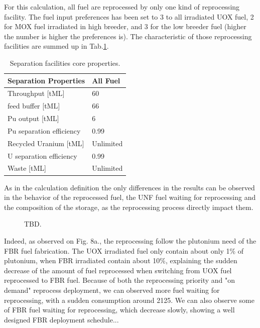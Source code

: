 \documentclass[12pt]{article}
\begin{document}
For this calculation, all fuel are reprocessed by
only one kind of reprocessing facility. The fuel
input preferences has been set to 3 to all
irradiated UOX fuel, 2 for MOX fuel irradiated in
high breeder, and 3 for the low breeder fuel
(higher the number is higher the preferences is).
The characteristic of those reprocessing
facilities are summed up in
Tab.\ref{tab:fuelfab_2}.

\begin{table}[h!]
\centering
\begin{tabular}{ll}
\hline
Separation Properties	&	All Fuel	\\
\hline
Throughput [tML]		&	60		\\
feed buffer [tML]		&	66		\\
Pu output  [tML]		&	6		\\
Pu separation efficiency	&	0.99		\\
Recycled Uranium [tML]	&	Unlimited	\\
U separation efficiency	&	0.99		\\
Waste [tML]			&	Unlimited	\\
\hline
\end{tabular}
\caption{Separation facilities core properties.}
\label{tab:fuelfab_2}
\end{table}


As in the calculation definition the only
differences in the results can be observed in the
behavior of the reprocessed fuel, the UNF fuel
waiting for reprocessing and the composition of
the storage, as the reprocessing process directly
impact them.

\begin{figure}[h!]
\centering
{}
\caption{TBD.\label{fig:ARR_FWR_SFC_2} }
\end{figure}

Indeed, as observed on Fig. 8a., the reprocessing
follow the plutonium need of the FBR fuel
fabrication. The UOX irradiated fuel only contain
about only 1\% of plutonium, when FBR irradiated
contain about 10\%, explaining the sudden decrease
of the  amount of fuel reprocessed when switching
from UOX fuel reprocessed to FBR fuel.
Because of both the reprocessing priority and "on
demand" reprocess deployment, we can observed more
fuel waiting for reprocessing, with a sudden
consumption around 2125. We can also observe some
of FBR fuel waiting for reprocessing, which
decrease slowly, showing a well designed FBR
deployment schedule...
\end{document}
